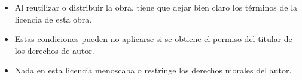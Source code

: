 \begin{itemize}
\item Al reutilizar o distribuir la obra, tiene que dejar bien claro los términos de la licencia de esta obra.
\item Estas condiciones pueden no aplicarse si se obtiene el permiso del titular de los derechos de autor.
\item Nada en esta licencia menoscaba o restringe los derechos morales del autor.
\end{itemize}